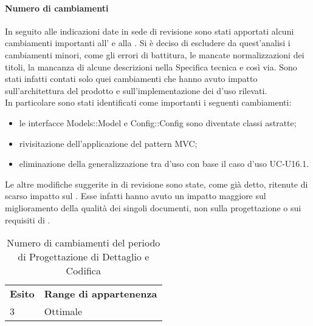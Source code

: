 \paragraph*{Numero di cambiamenti} 
In seguito alle indicazioni date in sede di revisione sono stati apportati alcuni cambiamenti importanti all'\AnalisiDeiRequisiti{} e alla \SpecificaTecnica. Si è deciso di escludere da quest'analisi i cambiamenti minori, come gli errori di battitura, le mancate normalizzazioni dei titoli, la mancanza di alcune descrizioni nella Specifica tecnica e così via. Sono stati infatti contati solo quei cambiamenti che hanno avuto impatto sull'architettura del prodotto e sull'implementazione dei  d'uso rilevati. \\
In particolare sono stati identificati come importanti i seguenti cambiamenti:
\begin{itemize}
\item le interfacce Models::Model e Config::Config sono diventate classi astratte;
\item rivisitazione dell'applicazione del pattern MVC;
\item eliminazione della generalizzazione tra  d'uso con base il caso d'uso UC-U16.1.
\end{itemize}
Le altre modifiche suggerite in  di revisione sono state, come già detto, ritenute di scarso impatto sul . Esse infatti hanno avuto un impatto maggiore sul miglioramento della qualità dei singoli documenti, non sulla progettazione o sui requisiti di . \\
\begin{table}[H]
\centering
\begin{tabular}{|l|l|}
\cline{1-2}
\textbf{Esito}  & \textbf{Range di appartenenza}  \\ \cline{1-2}
3 & Ottimale \\ \cline{1-2}
\end{tabular}
\caption{Numero di cambiamenti del periodo di Progettazione di Dettaglio e Codifica}
\end{table}

